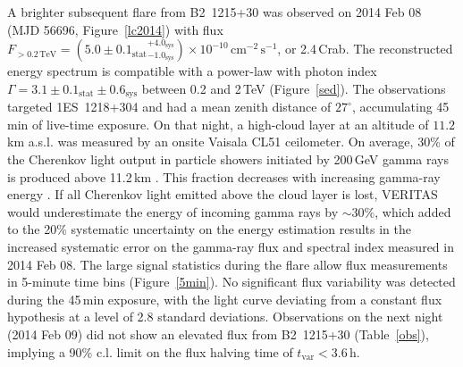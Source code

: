 \documentclass[twocolumn]{aastex6}
\def\b2{B2~1215+30}
\def\lat{\textit{Fermi}-LAT}
\begin{document}
A brighter subsequent flare from \b2 was observed 
on 2014 Feb 08 (MJD 56696, Figure~\ref{lc2014}) with  flux $F_{>0.2\,\mathrm{TeV}}= ( 5.0 \pm 0.1_{\mathrm{stat}} {}^{+4.0_\mathrm{sys}} _{-1.0_\mathrm{sys}} ) \times 10^{-10}\,\mathrm{cm}^{-2}\,\mathrm{s}^{-1}$, 
or 2.4\,Crab. The reconstructed energy spectrum is compatible with a power-law with photon index $\Gamma = 3.1 \pm 0.1_\mathrm{stat} \pm 0.6_\mathrm{sys}$ between 0.2 and 2\,TeV (Figure~\ref{sed}). The observations targeted 1ES~1218+304 and had a mean zenith distance of $27^{\circ}$, accumulating 45\,min of live-time exposure.
On that night, a high-cloud layer  at an altitude of $11.2$\,km a.s.l. was measured by an onsite Vaisala CL51 ceilometer. 
On average, 30\% of the Cherenkov light output in particle showers initiated by 200\,GeV gamma rays is produced above 11.2\,km \citep[see, e.g.,][]{1941RvMP...13..240R}. This fraction decreases with increasing gamma-ray energy \citep[see, e.g.,][]{2003WSAA...11.....W}.
If all Cherenkov light emitted above the cloud layer is lost, VERITAS would underestimate the energy of incoming gamma rays by $\sim 30\%$, which added to the 20\% systematic uncertainty on the energy estimation results in the increased systematic error on the gamma-ray flux and spectral index measured in 2014 Feb 08.
The large signal statistics during the flare allow flux measurements in 5-minute time bins (Figure~\ref{5min}). No significant flux variability was detected during the 45\,min exposure, with the light curve deviating from a constant flux hypothesis at a level of 2.8 standard deviations. Observations on the next night (2014 Feb 09) did not show an elevated flux from \b2  (Table~\ref{obs}), implying a 90\% c.l. limit on the flux halving time of 
$t_\mathrm{var} < 3.6$\,h.

\begin{figure*}[htbp]
\centering
{}
\caption{TeV (\emph{top}), GeV (\emph{middle}), and optical (\emph{bottom}) light curves of \b2 in 2013 (\emph{left panel}) and 2014 (\emph{right panel}). Fluxes are calculated in 1-day bins for VERITAS. \lat\ fluxes are calculated with 3-day integration bins (blue crosses) and 1-day bins (orange crosses) around the time of the 2014 flare. Down-pointing triangles indicate 95\% c.l. upper limits derived from the \lat\ data for time bins with signal  smaller than 2$\sigma$. The yearly-averaged TeV flux in 2011 \citep[$8.0 \times 10^{-12}\,\mathrm{cm}^{-2}\,\mathrm{s}^{-1}$, ][]{veritas_1215} is shown by a red-dashed line, and a blue-dashed line indicates the average GeV flux from \citet{3fgl}. Statistical errors on the Tuorla optical fluxes are smaller than the data points.
}
\label{lc2013}
\label{lc2014}
\end{figure*} 
\end{document}
